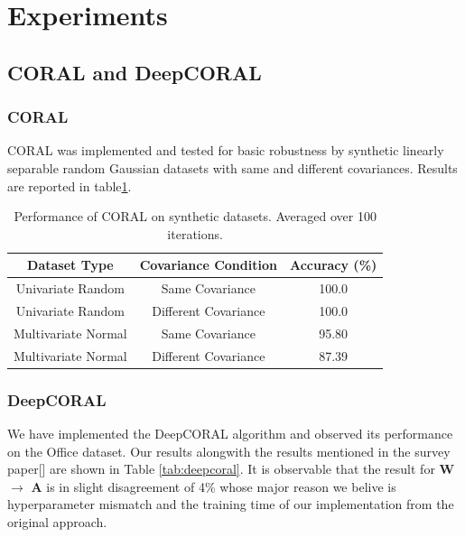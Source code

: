 \documentclass{article}
\begin{document}
\section{Experiments}
\subsection{CORAL and DeepCORAL}
\subsubsection{CORAL}
CORAL was implemented and tested for basic robustness by synthetic linearly separable random Gaussian datasets with same and different covariances. Results are reported in table\ref{tab:coral}.
\begin{table}
  \centering
  \caption{Performance of CORAL on synthetic datasets. Averaged over 100 iterations.}
  \label{tab:coral}
  \begin{tabular}{ccc}
    \toprule
    \textbf{Dataset Type} & \textbf{Covariance Condition} & \textbf{Accuracy (\%)} \\
    \midrule
    Univariate Random & Same Covariance & 100.0 \\
    Univariate Random & Different Covariance & 100.0 \\
    Multivariate Normal & Same Covariance & 95.80 \\
    Multivariate Normal & Different Covariance & 87.39 \\
    \bottomrule
  \end{tabular}
\end{table}

\subsubsection{DeepCORAL}
We have implemented the DeepCORAL algorithm and observed its performance on the Office dataset. Our results alongwith the results mentioned in the survey paper[\cite{DeepCoral}] are shown in Table \ref{tab:deepcoral}. It is observable that the result for \textbf{W}$\rightarrow$ \textbf{A} is in slight disagreement of 4\% whose major reason we belive is hyperparameter mismatch and the training time of our implementation from the original approach.
 
\end{document}
